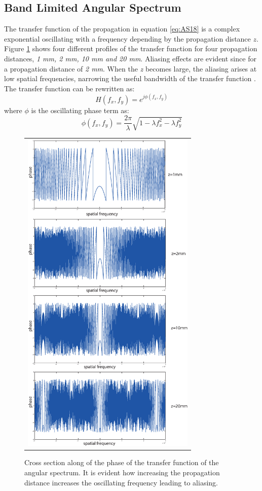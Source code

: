  \subsection{Band Limited Angular Spectrum}
 The transfer function of the propagation in equation \ref{eq:AS18} is a complex exponential oscillating with a frequency depending by the propagation distance $z$. Figure \ref{fig:AStransfer} shows four different profiles of the transfer function for four propagation distances, \textit{1 mm, 2 mm, 10 mm and 20 mm}. Aliasing effects are evident since for a propagation distance of \textit{2 mm}. When the \textit{z} becomes large, the aliasing arises at low spatial frequencies, narrowing the useful bandwidth of the transfer function \cite{matsushima2009band}.
 The transfer function can be rewritten as:
 \begin{equation}
 	\label{eq:BL1}
 	H(f_x,f_y) = e^{j \phi(f_x,f_y)}
 \end{equation}
 where $\phi$ is the oscillating phase term as:
 \begin{equation}
 	\label{eq:BL2}
 	\phi(f_x,f_y)=\dfrac{2\pi}{\lambda}\sqrt{1-\lambda f_x^2-\lambda f_y^2}
 \end{equation}
 \newpage
 \begin{figure}[H]
 	\begin{center}
 		\begin{tabular}{c}
 			\includegraphics[height=16cm]{phaseH01new.eps}
 		\end{tabular}
 	\end{center}
 	\caption 	{ \label{fig:AStransfer} 
 		Cross section along of the phase of the transfer function of the angular spectrum. It is evident how increasing the propagation distance increases the oscillating frequency leading to aliasing. }
 \end{figure}

